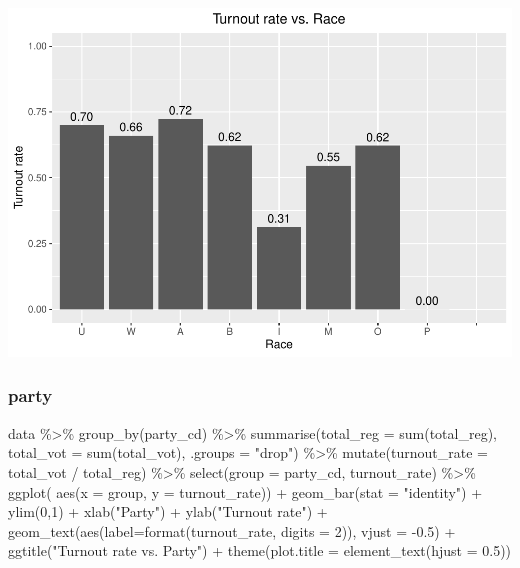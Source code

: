 \documentclass[
]{article}
\newenvironment{Shaded}{\begin{snugshade}}{\end{snugshade}}
\newcommand{\AttributeTok}[1]{\textcolor[rgb]{0.77,0.63,0.00}{#1}}
\newcommand{\DecValTok}[1]{\textcolor[rgb]{0.00,0.00,0.81}{#1}}
\newcommand{\FloatTok}[1]{\textcolor[rgb]{0.00,0.00,0.81}{#1}}
\newcommand{\FunctionTok}[1]{\textcolor[rgb]{0.00,0.00,0.00}{#1}}
\newcommand{\NormalTok}[1]{#1}
\newcommand{\SpecialCharTok}[1]{\textcolor[rgb]{0.00,0.00,0.00}{#1}}
\newcommand{\StringTok}[1]{\textcolor[rgb]{0.31,0.60,0.02}{#1}}
\begin{document}
\includegraphics{CS2_files/figure-latex/unnamed-chunk-9-1.pdf}

\hypertarget{party}{%
\subsubsection{party}\label{party}}

\begin{Shaded}
\begin{Highlighting}[]
\NormalTok{data }\SpecialCharTok{\%\textgreater{}\%}
  \FunctionTok{group\_by}\NormalTok{(party\_cd) }\SpecialCharTok{\%\textgreater{}\%}
  \FunctionTok{summarise}\NormalTok{(}\AttributeTok{total\_reg =} \FunctionTok{sum}\NormalTok{(total\_reg),}
            \AttributeTok{total\_vot =} \FunctionTok{sum}\NormalTok{(total\_vot), }\AttributeTok{.groups =} \StringTok{"drop"}\NormalTok{) }\SpecialCharTok{\%\textgreater{}\%}
  \FunctionTok{mutate}\NormalTok{(}\AttributeTok{turnout\_rate =}\NormalTok{ total\_vot }\SpecialCharTok{/}\NormalTok{ total\_reg) }\SpecialCharTok{\%\textgreater{}\%}
  \FunctionTok{select}\NormalTok{(}\AttributeTok{group =}\NormalTok{ party\_cd, turnout\_rate) }\SpecialCharTok{\%\textgreater{}\%}
  \FunctionTok{ggplot}\NormalTok{( }\FunctionTok{aes}\NormalTok{(}\AttributeTok{x =}\NormalTok{ group, }\AttributeTok{y =}\NormalTok{ turnout\_rate)) }\SpecialCharTok{+}
  \FunctionTok{geom\_bar}\NormalTok{(}\AttributeTok{stat =} \StringTok{"identity"}\NormalTok{) }\SpecialCharTok{+}
  \FunctionTok{ylim}\NormalTok{(}\DecValTok{0}\NormalTok{,}\DecValTok{1}\NormalTok{) }\SpecialCharTok{+}
  \FunctionTok{xlab}\NormalTok{(}\StringTok{"Party"}\NormalTok{) }\SpecialCharTok{+} \FunctionTok{ylab}\NormalTok{(}\StringTok{"Turnout rate"}\NormalTok{) }\SpecialCharTok{+}
  \FunctionTok{geom\_text}\NormalTok{(}\FunctionTok{aes}\NormalTok{(}\AttributeTok{label=}\FunctionTok{format}\NormalTok{(turnout\_rate, }\AttributeTok{digits =} \DecValTok{2}\NormalTok{)), }\AttributeTok{vjust =} \SpecialCharTok{{-}}\FloatTok{0.5}\NormalTok{) }\SpecialCharTok{+}
  \FunctionTok{ggtitle}\NormalTok{(}\StringTok{"Turnout rate vs. Party"}\NormalTok{) }\SpecialCharTok{+}
    \FunctionTok{theme}\NormalTok{(}\AttributeTok{plot.title =} \FunctionTok{element\_text}\NormalTok{(}\AttributeTok{hjust =} \FloatTok{0.5}\NormalTok{))}
\end{Highlighting}
\end{Shaded}
\end{document}
